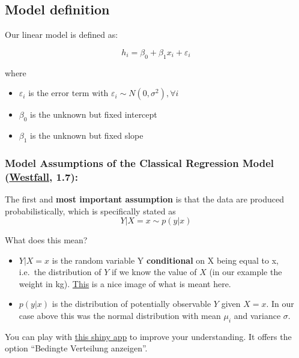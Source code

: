 \documentclass[
]{book}
\providecommand{\tightlist}{%
  \setlength{\itemsep}{0pt}\setlength{\parskip}{0pt}}
\begin{document}
\subsection{Model definition}\label{model-definition-1}

Our linear model is defined as:

\[h_i = \beta_0 + \beta_1 x_i + \varepsilon_i\]

where

\begin{itemize}
\tightlist
\item
  \(\varepsilon_i\) is the error term with \(\varepsilon_i \sim N(0, \sigma^2), \forall i\)
\item
  \(\beta_0\) is the unknown but fixed intercept
\item
  \(\beta_1\) is the unknown but fixed slope
\end{itemize}

\subsubsection{\texorpdfstring{Model Assumptions of the Classical Regression Model (\href{https://www.routledge.com/Understanding-Regression-Analysis-A-Conditional-Distribution-Approach/Westfall-Arias/p/book/9780367493516?srsltid=AfmBOore3O_Ciecl0TTkr9AjPIY1d6OmbQa7o7IAdKpTSkD8s9HkwzD4}{Westfall}, 1.7):}{Model Assumptions of the Classical Regression Model (Westfall, 1.7):}}\label{_model_assumptions}

The first and \textbf{most important assumption} is that the data are produced\\
probabilistically, which is specifically stated as
\[Y|X = x \sim p(y|x)\]

What does this mean?

\begin{itemize}
\tightlist
\item
  \(Y|X = x\) is the random variable Y \textbf{conditional} on X being equal to x, i.e.~the
  distribution of \(Y\) if we know the value of \(X\) (in our example the weight in kg).
  \href{https://blogs.sas.com/content/iml/files/2015/09/GLM_normal_identity.png}{This} is a nice image of what is meant here.
\item
  \(p(y|x)\) is the distribution of potentially observable \(Y\) given \(X = x\).
  In our case above this was the normal distribution with mean \(\mu_i\) and variance \(\sigma\).
\end{itemize}

You can play with \href{https://psychmeth.shinyapps.io/Regression-NVFehler/}{this shiny app} to improve your understanding.
It offers the option ``Bedingte Verteilung anzeigen''.
\end{document}
